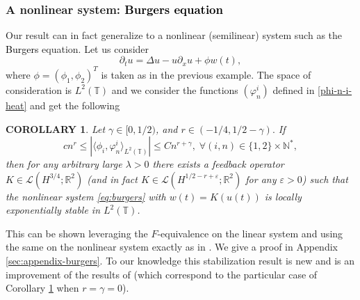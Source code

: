 \documentclass[11pt, dvipsnames]{amsart}
\newtheorem{corollary}[theorem]{COROLLARY}
\begin{document}
\subsubsection{A nonlinear system: \textcolor{black}{Burgers equation}}\label{sec-nonlinear}
Our result can in fact generalize to a nonlinear (semilinear) system such as the \textcolor{black}{Burgers} equation. Let us consider
\begin{equation}
\label{eq:burgers}
    \partial_{t} u = \Delta u - u\partial_{x}u+\phi w(t),
\end{equation}
where $\phi=(\phi_{1},\phi_{2})^{T}$ is taken as in the previous example. The space of consideration is $L^{2}(\mathbb{T})$ and we consider the functions $(\varphi_n^i)$ defined in \eqref{phi-n-i-heat} and get the following
\begin{corollary}
\label{cor:burgers}
Let $\gamma\in [0,1/2)$, and $r\in (-1/4,1/2-\gamma).$ If  
    \begin{equation}
    \label{eq:condburgers}
    c n^r\leq |\langle \phi_{i},\varphi_{n}^{i}\rangle_{L^{2}(\mathbb{T})}|\leq C n^{r+\gamma},\;\forall (i,n)\in \{1,2\}\times\mathbb{N}^{*},
    \end{equation}
    then for any arbitrary large $\lambda>0$ there exists a feedback operator $K\in \mathcal{L}(H^{3/4};\mathbb{R}^{2})$ (and in fact $K\in\mathcal{L}(H^{1/2-r+\varepsilon};\mathbb{R}^{2})$ for any $\varepsilon>0$) such that the nonlinear system \eqref{eq:burgers} with $w(t)=K(u(t))$ is locally exponentially stable in $L^{2}(\mathbb{T})$.
\end{corollary}
This can be shown leveraging the $F$-equivalence on the linear system and using the same on the nonlinear system exactly as in \cite{Gagnon2022-fredholm-laplacien}. We give a proof in Appendix \ref{sec:appendix-burgers}. To our knowledge this stabilization result is new and is an improvement of the results of \cite{Gagnon2022-fredholm-laplacien} (which correspond to the particular case of Corollary \ref{cor:burgers} when $r=\gamma=0$). 
\end{document}
